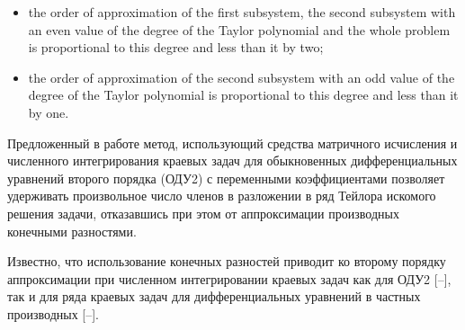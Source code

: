 {\begin{itemize}
\item[a)] 	the order of approximation of the first subsystem, the second subsystem with an even value of the degree of the Taylor polynomial and the whole problem is proportional to this degree and less than it by two; 



\item[b)]	the order of approximation of the second subsystem with an odd value of the degree of the Taylor polynomial is proportional to this degree and less than it by one.



\end{itemize}

}













\date{}








\renewcommand{\JournalDataOnline}{\displaydate{make}}



\makerutitle









Предложенный в работе \cite{mc:bib1} метод, использующий средства матричного исчисления и численного интегрирования краевых задач для обыкновенных дифференциальных уравнений второго порядка (ОДУ2) с переменными коэффициентами позволяет удерживать произвольное число членов в разложении в ряд Тейлора искомого решения задачи, отказавшись при этом от аппроксимации производных конечными разностями. 

Известно, что использование конечных разностей приводит ко второму порядку аппроксимации при численном интегрировании краевых задач как  для ОДУ2 [--], так и для ряда краевых задач для дифференциальных уравнений в частных производных [--]. 


